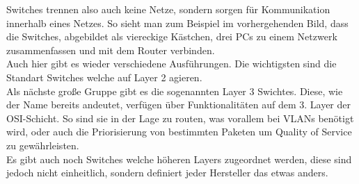 \documentclass[12pt,a4paper]{report}
\begin{document}
Switches trennen also auch keine Netze, sondern sorgen für Kommunikation innerhalb eines Netzes. So sieht man zum Beispiel im vorhergehenden Bild, dass die Switches, abgebildet als viereckige Kästchen, drei PCs zu einem Netzwerk zusammenfassen und mit dem Router verbinden.\\


Auch hier gibt es wieder verschiedene Ausführungen. Die wichtigsten sind die Standart Switches welche auf Layer 2 agieren.\\
Als nächste große Gruppe gibt es die sogenannten Layer 3 Swichtes. Diese, wie der Name bereits andeutet, verfügen über Funktionalitäten auf dem 3. Layer der OSI-Schicht. So sind sie in der Lage zu routen, was vorallem bei VLANs benötigt wird, oder auch die Priorisierung von bestimmten Paketen um Quality of Service zu gewährleisten.\\
Es gibt auch noch Switches welche höheren Layers zugeordnet werden, diese sind jedoch nicht einheitlich, sondern definiert jeder Hersteller das etwas anders.
\end{document}
